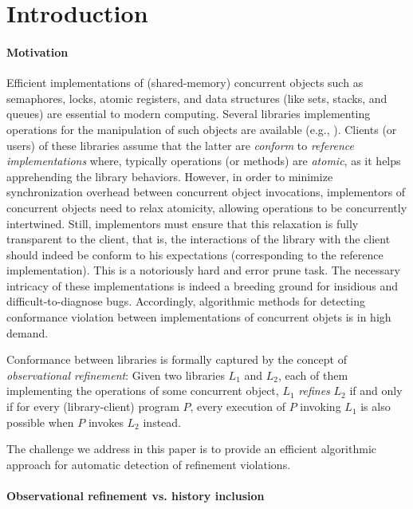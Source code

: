 \section{Introduction}

\paragraph{Motivation}

Efficient implementations of (shared-memory) concurrent
objects such as semaphores, locks, atomic registers, and data structures (like
sets, stacks, and queues) are essential to modern computing. Several libraries
implementing operations for the manipulation of such objects are available
(e.g., \cite{}). Clients (or users) of these libraries assume that the latter
are \emph{conform} to \emph{reference implementations} where, typically
operations (or methods) are \emph{atomic}, as it helps apprehending the library
behaviors. However, in order to minimize synchronization overhead between
concurrent object invocations, implementors of concurrent objects need to relax
atomicity, allowing operations to be concurrently intertwined. Still,
implementors must ensure that this relaxation is fully transparent to the
client, that is, the interactions of the library with the client should indeed
be conform to his expectations (corresponding to the reference implementation).
This is a notoriously hard and error prune task. The necessary intricacy of
these implementations is indeed a breeding ground for insidious and
difficult-to-diagnose bugs. Accordingly, algorithmic methods for detecting
conformance violation between implementations of concurrent objets is in high
demand.

Conformance between libraries is formally captured by the concept of
\emph{observational refinement}: Given two libraries $L_1$ and $L_2$, each of
them implementing the operations of some concurrent object, $L_1$
\emph{refines} $L_2$ if and only if for every (library-client) program $P$,
every execution of $P$ invoking $L_1$ is also possible when $P$ invokes $L_2$
instead.

The challenge we address in this paper is to provide an efficient algorithmic
approach for automatic detection of refinement violations.

\paragraph{Observational refinement vs. history inclusion}

